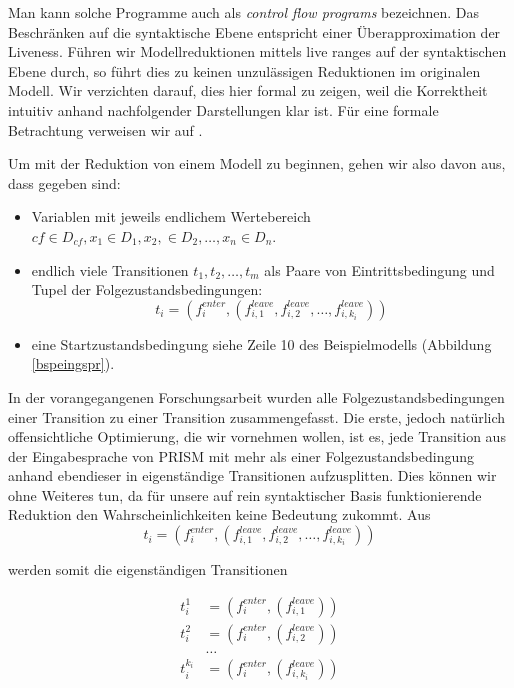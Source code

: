 \documentclass[a4paper]{article}
\theoremstyle{nonumberplain}
\begin{document}
Man kann solche Programme auch als \textit{control flow programs} bezeichnen.
Das Beschränken auf die syntaktische Ebene entspricht einer Überapproximation der Liveness.
Führen wir Modellreduktionen mittels live ranges auf der syntaktischen Ebene durch, so führt dies zu keinen unzulässigen Reduktionen im originalen Modell.
Wir verzichten darauf, dies hier formal zu zeigen, weil die Korrektheit intuitiv anhand nachfolgender Darstellungen klar ist. Für eine formale Betrachtung verweisen wir auf \cite{ThesisDubs}.


Um mit der Reduktion von einem Modell zu beginnen, gehen wir also davon aus, dass gegeben sind:
\begin{itemize}
	\item Variablen mit jeweils endlichem Wertebereich $cf \in D_{cf}, x_1 \in D_{1}, x_2, \in D_2, \dots, x_n \in D_n$.
	\item endlich viele Transitionen $t_1, t_2, \dots , t_m$ als Paare von Eintrittsbedingung und Tupel der Folgezustandsbedingungen:
	\[t_i = (f^{enter}_i, (f^{leave}_{i,1}, f^{leave}_{i,2}, \dots , f^{leave}_{i,k_i}))\]
	\item eine Startzustandsbedingung siehe Zeile 10 des Beispielmodells (Abbildung \ref{bspeingspr}).
\end{itemize}

In der vorangegangenen Forschungsarbeit \cite{dubslaff2019breaking} wurden alle Folgezustandsbedingungen einer Transition zu einer Transition zusammengefasst.
Die erste, jedoch natürlich offensichtliche Optimierung, die wir vornehmen wollen, ist es, jede Transition aus der Eingabesprache von PRISM mit mehr als einer Folgezustandsbedingung anhand ebendieser in eigenständige Transitionen aufzusplitten. Dies können wir ohne Weiteres tun, da für unsere auf rein syntaktischer Basis funktionierende Reduktion den Wahrscheinlichkeiten keine Bedeutung zukommt.
Aus 
\begin{equation*}
t_i = (f^{enter}_i, (f^{leave}_{i,1}, f^{leave}_{i,2}, \dots , f^{leave}_{i,k_i}))
\end{equation*}

werden somit die eigenständigen Transitionen

\begin{align*}
t_i^1 & = (f^{enter}_i, (f^{leave}_{i,1})) \\
t_i^2 & = (f^{enter}_i, (f^{leave}_{i,2})) \\
& \dots \\
t_i^{k_i} &= (f^{enter}_i, (f^{leave}_{i,k_i}))
\end{align*}
\end{document}
